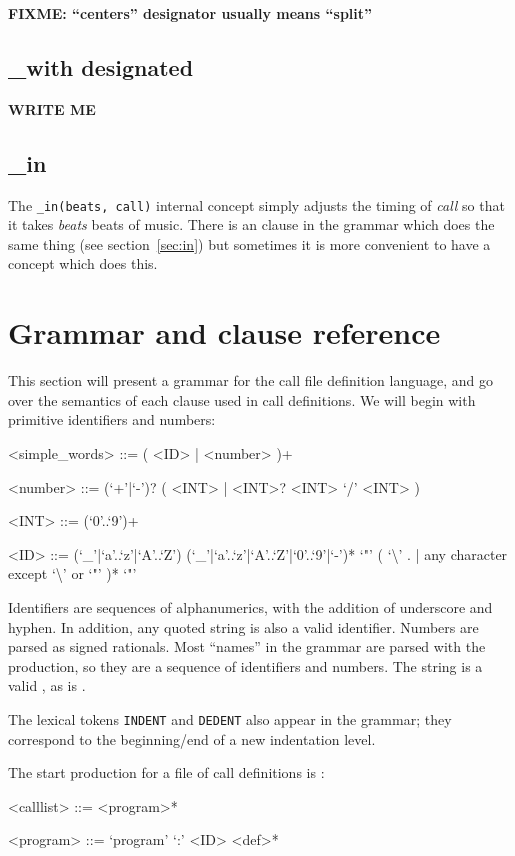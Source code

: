 \documentclass[12pt]{article}
\renewcommand{\call}[1]{\texttt{#1}} %
\begin{document}
\textbf{FIXME: ``centers'' designator usually means ``split''}

\subsection{_with designated}

\textbf{WRITE ME}

\subsection{_in}\label{sec:inconcept}
The \call{_in(beats, call)} internal concept simply adjusts the timing
of \textit{call} so that it takes \textit{beats} beats of music.
There is an  clause in the grammar which does the same
thing (see section~\ref{sec:in}) but sometimes it is more convenient
to have a concept which does this.

\section{Grammar and clause reference}
This section will present a grammar for the call file definition
language, and go over the semantics of each clause used in call
definitions.  We will begin with primitive identifiers and numbers:
\begin{grammar}
<simple_words> ::= ( <ID> | <number> )+

<number> ::= (`+'|`-')? ( <INT> | <INT>? <INT> `/' <INT> )

<INT> ::= (`0'..`9')+

<ID> ::= (`_'|`a'..`z'|`A'..`Z') (`_'|`a'..`z'|`A'..`Z'|`0'..`9'|`-')*
     \alt `"' ( `\textbackslash' . | any character except `\textbackslash' or `"' )* `"'
\end{grammar}

Identifiers are sequences of alphanumerics, with the addition of
underscore and hyphen.  In addition, any quoted string is also a valid
identifier.  Numbers are parsed as signed rationals.  Most
``names'' in the grammar are parsed with the 
production, so they are a sequence of identifiers and numbers.  The
string  is a valid
, as is .

The lexical tokens {\tt INDENT} and {\tt DEDENT} also appear in the grammar;
they correspond to the beginning/end of a new indentation level.

The start production for a file of call definitions is :
\begin{grammar}
<calllist> ::= <program>*

<program> ::= `program' `:' <ID> <def>*
\end{grammar}
\end{document}
